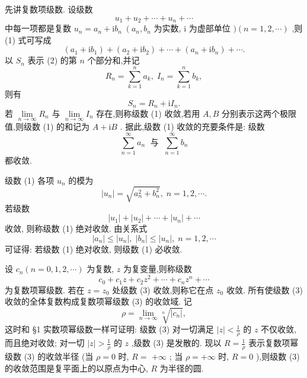 先讲复数项级数. 设级数
\[
{u}_{1} + {u}_{2} + \cdots  + {u}_{n} + \cdots  \tag{1}
\]
中每一项都是复数 \({u}_{n} = {a}_{n} + \mathrm{i}{b}_{n}\;\left( {{a}_{n},{b}_{n}}\right.\) 为实数, \(\mathrm{i}\) 为虚部单位 \()\left( {n = 1,2,\cdots }\right)\) ,则 (1) 式可写成
\[
\left( {{a}_{1} + \mathrm{i}{b}_{1}}\right)  + \left( {{a}_{2} + \mathrm{i}{b}_{2}}\right)  + \cdots  + \left( {{a}_{n} + \mathrm{i}{b}_{n}}\right)  + \cdots . \tag{2}
\]
以 \({S}_{n}\) 表示 (2) 的第 \(n\) 个部分和,并记
\[
{R}_{n} = \mathop{\sum }\limits_{{k = 1}}^{n}{a}_{k},\;{I}_{n} = \mathop{\sum }\limits_{{k = 1}}^{n}{b}_{k},
\]
则有
\[
{S}_{n} = {R}_{n} + \mathrm{i}{I}_{n}.
\]
若 \(\mathop{\lim }\limits_{{n \rightarrow  \infty }}{R}_{n}\) 与 \(\mathop{\lim }\limits_{{n \rightarrow  \infty }}{I}_{n}\) 存在,则称级数 (1) 收敛,若用 \(A,B\) 分别表示这两个极限值,则级数 (1) 的和记为 \(A + \mathrm{i}B\) . 据此,级数 (1) 收敛的充要条件是: 级数
\[
\mathop{\sum }\limits_{{n = 1}}^{\infty }{a}_{n}\;\text{ 与 }\;\mathop{\sum }\limits_{{n = 1}}^{\infty }{b}_{n}
\]
都收敛.

级数 (1) 各项 \({u}_{n}\) 的模为
\[
\left| {u}_{n}\right|  = \sqrt{{a}_{n}^{2} + {b}_{n}^{2}},\;n = 1,2,\cdots .
\]
若级数
\[
\left| {u}_{1}\right|  + \left| {u}_{2}\right|  + \cdots  + \left| {u}_{n}\right|  + \cdots
\]
收敛, 则称级数 (1) 绝对收敛. 由关系式
\[
\left| {a}_{n}\right|  \leq  \left| {u}_{n}\right| ,\;\left| {b}_{n}\right|  \leq  \left| {u}_{n}\right| ,\;n = 1,2,\cdots
\]
可证得: 若级数 (1) 绝对收敛, 则级数 (1) 必收敛.

设 \({c}_{n}\left( {n = 0,1,2,\cdots }\right)\) 为复数, \(z\) 为复变量,则称级数
\[
{c}_{0} + {c}_{1}z + {c}_{2}{z}^{2} + \cdots  + {c}_{n}{z}^{n} + \cdots  \tag{3}
\]
为复数项幂级数. 若在 \(z = {z}_{0}\) 处级数 (3) 收敛,则称它在点 \({z}_{0}\) 收敛. 所有使级数 (3) 收敛的全体复数构成复数项幂级数 (3) 的收敛域. 记
\[
\rho  = \mathop{\lim }\limits_{{n \rightarrow  \infty }}\sqrt[n]{\left| {c}_{n}\right| },
\]
这时和 §1 实数项幂级数一样可证明: 级数 (3) 对一切满足 \(\left| z\right|  < \frac{1}{\rho }\) 的 \(z\) 不仅收敛,而且绝对收敛; 对一切 \(\left| z\right|  > \frac{1}{\rho }\) 的 \(z\) ,级数 (3) 是发散的. 现以 \(R = \frac{1}{\rho }\) 表示复数项幂级数 (3) 的收敛半径 (当 \(\rho  = 0\) 时, \(R =\)  \(+ \infty\) ; 当 \(\rho  =  + \infty\) 时, \(R = 0\) ),则级数 (3) 的收敛范围是复平面上的以原点为中心, \(R\) 为半径的圆.

